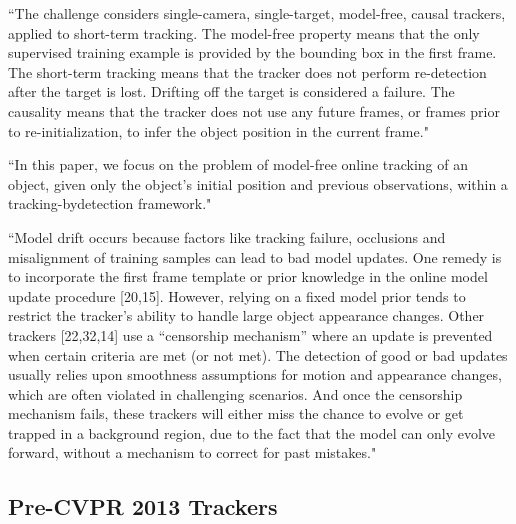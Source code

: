 ``The challenge considers single-camera, single-target, model-free, causal trackers, applied to short-term tracking. The model-free property means that the only supervised training example is provided by the bounding box in the first frame.  The short-term tracking means that the tracker does not perform re-detection after the target is lost. Drifting off the target is considered a failure. The causality means that the tracker does not use any future frames, or frames prior to re-initialization, to infer the object position in the current frame." \cite{kristan2014visual}

``In this paper, we focus on the problem of model-free online tracking of an object,
given only the object’s initial position and previous observations, within a tracking-bydetection
framework."\cite{zhang2014meem}

``Model drift occurs because factors like tracking failure, occlusions and misalignment
of training samples can lead to bad model updates. One remedy is to incorporate the first
frame template or prior knowledge in the online model update procedure [20,15]. However,
relying on a fixed model prior tends to restrict the tracker’s ability to handle large
object appearance changes. Other trackers [22,32,14] use a “censorship mechanism”
where an update is prevented when certain criteria are met (or not met). The detection
of good or bad updates usually relies upon smoothness assumptions for motion and
appearance changes, which are often violated in challenging scenarios. And once the
censorship mechanism fails, these trackers will either miss the chance to evolve or get
trapped in a background region, due to the fact that the model can only evolve forward,
without a mechanism to correct for past mistakes."\cite{zhang2014meem}

\subsection{Pre-CVPR 2013 Trackers}



